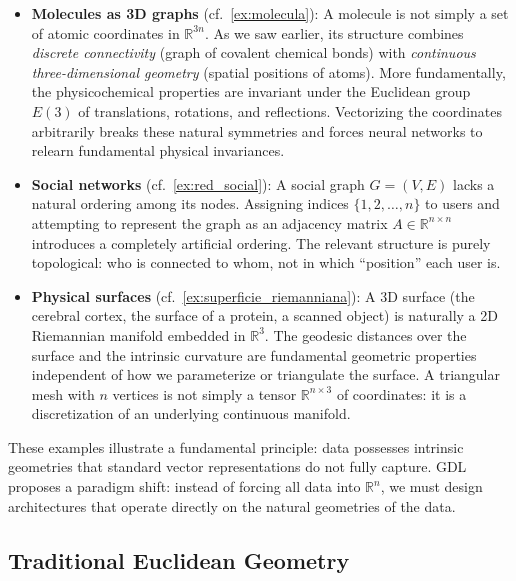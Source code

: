 \begin{itemize}
    \item \textbf{Molecules as 3D graphs} (cf.~\autoref{ex:molecula}): A molecule is not simply a set of atomic coordinates in $\mathbb{R}^{3n}$. As we saw earlier, its structure combines \textit{discrete connectivity} (graph of covalent chemical bonds) with \textit{continuous three-dimensional geometry} (spatial positions of atoms). More fundamentally, the physicochemical properties are invariant under the Euclidean group $E(3)$ of translations, rotations, and reflections. Vectorizing the coordinates arbitrarily breaks these natural symmetries and forces neural networks to relearn fundamental physical invariances.

    \item \textbf{Social networks} (cf.~\autoref{ex:red_social}): A social graph $G = (V, E)$ lacks a natural ordering among its nodes. Assigning indices $\{1, 2, \ldots, n\}$ to users and attempting to represent the graph as an adjacency matrix $A \in \mathbb{R}^{n \times n}$ introduces a completely artificial ordering. The relevant structure is purely topological: who is connected to whom, not in which ``position'' each user is.

    \item \textbf{Physical surfaces} (cf.~\autoref{ex:superficie_riemanniana}): A 3D surface (the cerebral cortex, the surface of a protein, a scanned object) is naturally a 2D Riemannian manifold embedded in $\mathbb{R}^3$. The geodesic distances over the surface and the intrinsic curvature are fundamental geometric properties independent of how we parameterize or triangulate the surface. A triangular mesh with $n$ vertices is not simply a tensor $\mathbb{R}^{n \times 3}$ of coordinates: it is a discretization of an underlying continuous manifold.
\end{itemize}

These examples illustrate a fundamental principle: data possesses intrinsic geometries that standard vector representations do not fully capture. \gls{GDL} proposes a paradigm shift: instead of forcing all data into $\mathbb{R}^n$, we must design architectures that operate directly on the natural geometries of the data.

\subsection{Traditional Euclidean Geometry}\label{subsec:geometria_euclidiana}

